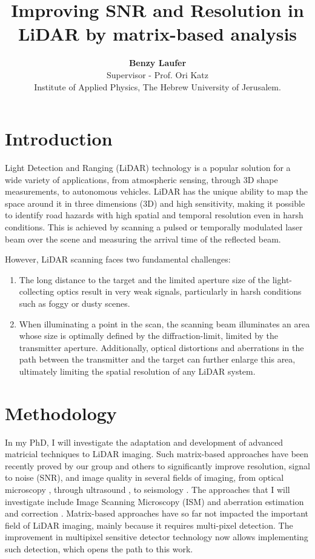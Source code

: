 \documentclass{article}
\title{\textbf{\Large Improving SNR and Resolution in LiDAR by matrix-based analysis}}
\author{
    \textbf{Benzy Laufer} \\  Supervisor - Prof. Ori Katz \\
    Institute of Applied Physics, The Hebrew University of Jerusalem. 
}
\begin{document}

\date{}

\maketitle

\section{Introduction}
\large Light Detection and Ranging (LiDAR) technology is a popular solution for a wide variety of applications, from atmospheric sensing, through 3D shape measurements, to autonomous vehicles. LiDAR has the unique ability to map the space around it in three dimensions (3D) and high sensitivity, making it possible to identify road hazards with high spatial and temporal resolution even in harsh conditions. This is achieved by scanning a pulsed or temporally modulated laser beam over the scene and measuring the arrival time of the reflected beam.

However, LiDAR scanning faces two fundamental challenges:
\begin{enumerate}
    \item The long distance to the target and the limited aperture size of the light-collecting optics result in very weak signals, particularly in harsh conditions such as foggy or dusty scenes.
    \item When illuminating a point in the scan, the scanning beam illuminates an area whose size is optimally defined by the diffraction-limit, limited by the transmitter aperture. Additionally, optical distortions and aberrations in the path between the transmitter and the target can further enlarge this area, ultimately limiting the spatial resolution of any LiDAR system.
\end{enumerate}

\section{Methodology}
In my PhD, I will investigate the adaptation and development of advanced matricial techniques to LiDAR imaging. Such matrix-based approaches have been recently proved by our group and others to significantly improve resolution, signal to noise (SNR), and image quality in several fields of imaging, from optical microscopy \cite{Badon2020}, through ultrasound \cite{PhysRevX.10.021048}, to seismology \cite{2018JB016361}. The approaches that I will investigate include Image Scanning Microscopy (ISM) \cite{muller} and aberration estimation and correction \cite{Badon2020}. Matrix-based approaches have so far not impacted the important field of LiDAR imaging, mainly because it requires multi-pixel detection. The improvement in multipixel sensitive detector technology now allows implementing such detection, which opens the path to this work.
\end{document}
